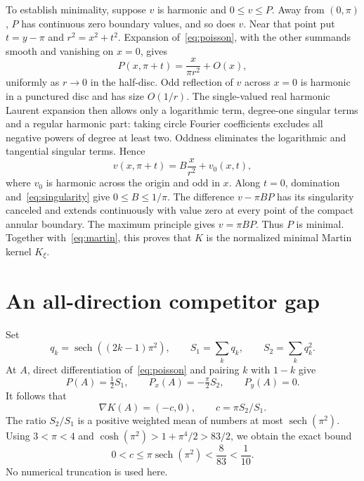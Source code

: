\documentclass[11pt]{article}
\newcommand{\sech}{\operatorname{sech}}
\begin{document}
To establish minimality, suppose $v$ is harmonic and $0\leq v\leq P$. Away from $(0,\pi)$, $P$ has continuous zero boundary values, and so does $v$. Near that point put $t=y-\pi$ and $r^2=x^2+t^2$. Expansion of~\eqref{eq:poisson}, with the other summands smooth and vanishing on $x=0$, gives
\begin{equation}\label{eq:singularity}
 P(x,\pi+t)=\frac{x}{\pi r^2}+O(x),
\end{equation}
uniformly as $r\to0$ in the half-disc. Odd reflection of $v$ across $x=0$ is harmonic in a punctured disc and has size $O(1/r)$. The single-valued real harmonic Laurent expansion then allows only a logarithmic term, degree-one singular terms and a regular harmonic part: taking circle Fourier coefficients excludes all negative powers of degree at least two. Oddness eliminates the logarithmic and tangential singular terms. Hence
\[
 v(x,\pi+t)=B\frac{x}{r^2}+v_0(x,t),
\]
where $v_0$ is harmonic across the origin and odd in $x$. Along $t=0$, domination and~\eqref{eq:singularity} give $0\leq B\leq1/\pi$. The difference $v-\pi BP$ has its singularity canceled and extends continuously with value zero at every point of the compact annular boundary. The maximum principle gives $v=\pi BP$. Thus $P$ is minimal. Together with~\eqref{eq:martin}, this proves that $K$ is the normalized minimal Martin kernel $K_\xi$.

\section{An all-direction competitor gap}
Set
\[
 q_k=\sech((2k-1)\pi^2),\qquad
 S_1=\sum_kq_k,\qquad S_2=\sum_kq_k^2.
\]
At $A$, direct differentiation of~\eqref{eq:poisson} and pairing $k$ with $1-k$ give
\[
 P(A)=\tfrac12S_1,\qquad P_x(A)=-\tfrac\pi2S_2,
 \qquad P_y(A)=0.
\]
It follows that
\begin{equation}\label{eq:c}
 \nabla K(A)=(-c,0),\qquad c=\pi S_2/S_1.
\end{equation}
The ratio $S_2/S_1$ is a positive weighted mean of numbers at most $\sech(\pi^2)$. Using $3<\pi<4$ and $\cosh(\pi^2)>1+\pi^4/2>83/2$, we obtain the exact bound
\begin{equation}\label{eq:cbound}
 0<c\leq\pi\sech(\pi^2)<\frac8{83}<\frac1{10}.
\end{equation}
No numerical truncation is used here.
\end{document}
